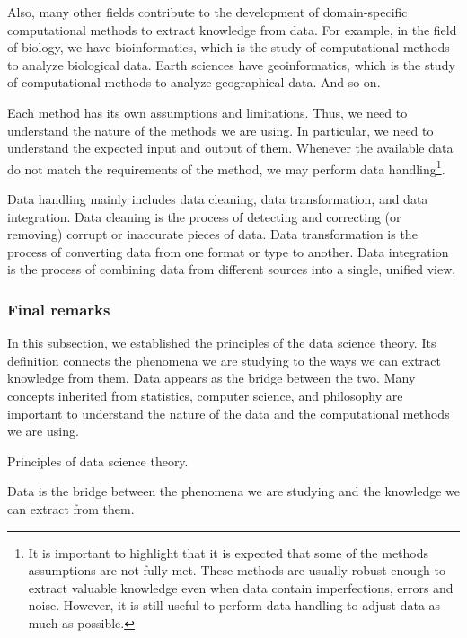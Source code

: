 Also, many other fields contribute to the development of domain-specific computational
methods to extract knowledge from data.  For example, in the field of biology, we have
bioinformatics, which is the study of computational methods to analyze biological data.
Earth sciences have geoinformatics, which is the study of computational methods to
analyze geographical data.  And so on.

Each method has its own assumptions and limitations.  Thus, we need to understand the
nature of the methods we are using.  In particular, we need to understand the
expected input and output of them.  Whenever the available data do not match the
requirements of the method, we may perform data handling\footnote{%
  It is important to highlight that it is expected that some of the methods assumptions
  are not fully met.  These methods are usually robust enough to extract valuable
  knowledge even when data contain imperfections, errors and noise.  However, it is still
  useful to perform data handling to adjust data as much as possible.%
}.

Data handling mainly includes data cleaning, data transformation, and data
integration. Data cleaning is the process of detecting and correcting (or removing)
corrupt or inaccurate pieces of data.  Data transformation is the process of converting
data from one format or type to another.  Data integration is the process of combining
data from different sources into a single, unified view.

\subsubsection{Final remarks}

In this subsection, we established the principles of the data science theory.  Its
definition connects the phenomena we are studying to the ways we can extract knowledge
from them.  Data appears as the bridge between the two.  Many concepts inherited
from statistics, computer science, and philosophy are important to understand the
nature of the data and the computational methods we are using.

\begin{figurebox}[label=fig:knowledge]{Principles of data science theory.}
  \centering
  \tcblower
  Data is the bridge between the phenomena we are studying and the knowledge we can
  extract from them.
\end{figurebox}

